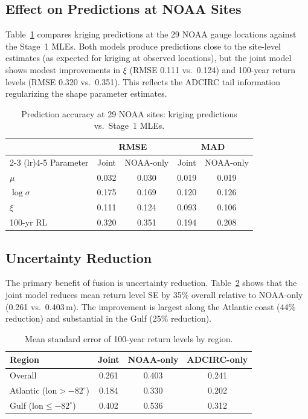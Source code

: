 \documentclass[11pt]{article}
\begin{document}
\subsection{Effect on Predictions at NOAA Sites}

Table~\ref{tab:noaa_comparison} compares kriging predictions at the 29 NOAA gauge locations against the Stage~1 MLEs. Both models produce predictions close to the site-level estimates (as expected for kriging at observed locations), but the joint model shows modest improvements in $\xi$ (RMSE 0.111 vs.\ 0.124) and 100-year return levels (RMSE 0.320 vs.\ 0.351). This reflects the ADCIRC tail information regularizing the shape parameter estimates.

\begin{table}[h]
\centering
\caption{Prediction accuracy at 29 NOAA sites: kriging predictions vs.\ Stage~1 MLEs.}
\label{tab:noaa_comparison}
\begin{tabular}{@{}lcccc@{}}
\toprule
& \multicolumn{2}{c}{RMSE} & \multicolumn{2}{c}{MAD} \\
\cmidrule(lr){2-3} \cmidrule(lr){4-5}
Parameter & Joint & NOAA-only & Joint & NOAA-only \\
\midrule
$\mu$ & 0.032 & 0.030 & 0.019 & 0.019 \\
$\log\sigma$ & 0.175 & 0.169 & 0.120 & 0.126 \\
$\xi$ & 0.111 & 0.124 & 0.093 & 0.106 \\
100-yr RL & 0.320 & 0.351 & 0.194 & 0.208 \\
\bottomrule
\end{tabular}
\end{table}

\subsection{Uncertainty Reduction}

The primary benefit of fusion is uncertainty reduction. Table~\ref{tab:se_comparison} shows that the joint model reduces mean return level SE by 35\% overall relative to NOAA-only (0.261 vs.\ 0.403\,m). The improvement is largest along the Atlantic coast (44\% reduction) and substantial in the Gulf (25\% reduction).

\begin{table}[h]
\centering
\caption{Mean standard error of 100-year return levels by region.}
\label{tab:se_comparison}
\begin{tabular}{@{}lccc@{}}
\toprule
Region & Joint & NOAA-only & ADCIRC-only \\
\midrule
Overall & 0.261 & 0.403 & 0.241 \\
Atlantic ($\text{lon} > -82^\circ$) & 0.184 & 0.330 & 0.202 \\
Gulf ($\text{lon} \leq -82^\circ$) & 0.402 & 0.536 & 0.312 \\
\bottomrule
\end{tabular}
\end{table}
\end{document}
